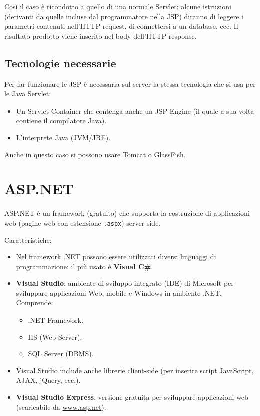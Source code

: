 Così il caso è ricondotto a quello di una normale Servlet: alcune istruzioni (derivanti da quelle incluse dal programmatore nella JSP) diranno di leggere i parametri contenuti nell'HTTP request, di connettersi a un database, ecc. Il risultato prodotto viene inserito nel body dell'HTTP response.

\subsection{Tecnologie necessarie}

Per far funzionare le JSP è necessaria sul server la stessa tecnologia che si usa per le Java Servlet:

\begin{itemize}
    \item Un Servlet Container che contenga anche un JSP Engine (il quale a sua volta contiene il compilatore Java).
    \item L'interprete Java (JVM/JRE).
\end{itemize}

Anche in questo caso si possono usare Tomcat o GlassFish.

\section{ASP.NET}

ASP.NET è un framework (gratuito) che supporta la costruzione di applicazioni web (pagine web con estensione \texttt{.aspx}) server-side.

Caratteristiche:

\begin{itemize}
    \item Nel framework .NET possono essere utilizzati diversi linguaggi di programmazione: il più usato è \textbf{Visual C\#}.
    \item \textbf{Visual Studio}: ambiente di sviluppo integrato (IDE) di Microsoft per sviluppare applicazioni Web, mobile e Windows in ambiente .NET. Comprende:
    \begin{itemize}
        \item .NET Framework.
        \item IIS (Web Server).
        \item SQL Server (DBMS).
    \end{itemize}
    \item Visual Studio include anche librerie client-side (per inserire script JavaScript, AJAX, jQuery, ecc.).
    \item \textbf{Visual Studio Express}: versione gratuita per sviluppare applicazioni web (scaricabile da \url{www.asp.net}).
\end{itemize}

